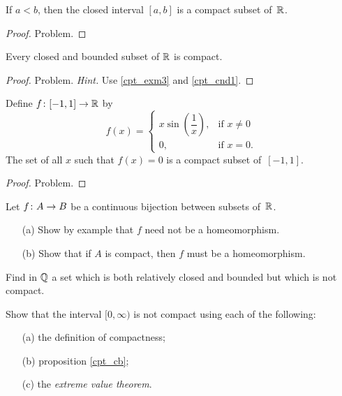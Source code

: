 \begin{exam}\label{cpt_exm3} If $a < b$, then the closed interval $[a,b]$ is a compact subset of~$\mathbb{R}$.
\end{exam}


\begin{proof} Problem.  \ns \end{proof}

\begin{exam}\label{HBthm} Every closed and bounded subset of $\mathbb{R}$ is compact.
\end{exam}

\begin{proof} Problem. \emph{Hint.}  Use \ref{cpt_exm3} and \ref{cpt_cnd1}. \ns
\end{proof}

\begin{exam} Define $f \colon [-1,1] \rightarrow \mathbb{R}$ by
   \[f(x) = \begin{cases}
             x\sin\left(\dfrac1x\right), &\text{if $x \ne 0$}\\
                                      0, &\text{if $x=0$}.
            \end{cases}\]
The set of all $x$ such that $f(x) = 0$ is a compact subset of~$[-1,1]$.
\end{exam}

\begin{proof} Problem.  \ns \end{proof}

\begin{prob} Let $f \colon A \rightarrow B$ be a continuous bijection between subsets of~$\mathbb{R}$.
 \begin{enumerate}
  \item[(a)] Show by example that $f$ need not be a homeomorphism.
  \item[(b)] Show that if $A$ is compact, then $f$ must be a homeomorphism.
 \end{enumerate}
\end{prob}

\begin{prob}\label{cpt_prb2} Find in $\mathbb{Q}$ a set which is both relatively closed and bounded
but which is not compact.
\end{prob}

\begin{prob} Show that the interval $[0,\infty)$ is not compact using each of the following:
 \begin{enumerate}
  \item[(a)] the definition of compactness;
  \item[(b)] proposition \ref{cpt_cb};
  \item[(c)] the \emph{extreme value theorem}.
 \end{enumerate}
\end{prob}

